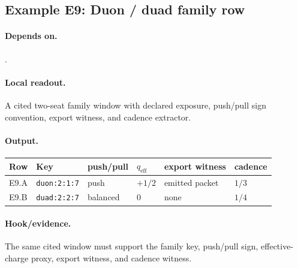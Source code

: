 \subsection{Example E9: Duon / duad family row}\label{ex:e9}
\paragraph{Depends on.} .
\paragraph{Local readout.} A cited two-seat family window with declared exposure, push/pull sign convention, export witness, and cadence extractor.
\paragraph{Output.}
{\footnotesize
\begin{center}
\begin{tabular}{@{}llllll@{}}
\toprule
Row & Key & push/pull & $q_{\mathrm{eff}}$ & export witness & cadence \\
\midrule
E9.A & \texttt{duon:2:1:7} & push & $+1/2$ & emitted packet & $1/3$ \\
E9.B & \texttt{duad:2:2:7} & balanced & $0$ & none & $1/4$ \\
\bottomrule
\end{tabular}
\end{center}}
\paragraph{Hook/evidence.} The same cited window must support the family key, push/pull sign, effective-charge proxy, export witness, and cadence witness.
